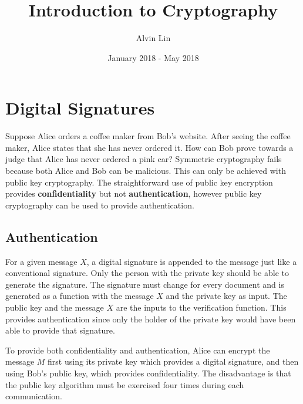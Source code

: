 \documentclass{math}
\title{Introduction to Cryptography}
\author{Alvin Lin}
\date{January 2018 - May 2018}
\begin{document}
\maketitle

\section*{Digital Signatures}
Suppose Alice orders a coffee maker from Bob's website. After seeing the coffee
maker, Alice states that she has never ordered it. How can Bob prove towards
a judge that Alice has never ordered a pink car? Symmetric cryptography fails
because both Alice and Bob can be malicious. This can only be achieved with
public key cryptography. The straightforward use of public key encryption
provides \textbf{confidentiality} but not \textbf{authentication}, however
public key cryptography can be used to provide authentication.

\subsection*{Authentication}
For a given message \( X \), a digital signature is appended to the message
just like a conventional signature. Only the person with the private key should
be able to generate the signature. The signature must change for every document
and is generated as a function with the message \( X \) and the private key
as input. The public key and the message \( X \) are the inputs to the
verification function. This provides authentication since only the holder of the
private key would have been able to provide that signature.
\par To provide both confidentiality and authentication, Alice can encrypt
the message \( M \) first using its private key which provides a digital
signature, and then using Bob's public key, which provides confidentiality.
The disadvantage is that the public key algorithm must be exercised four times
during each communication.
\end{document}
